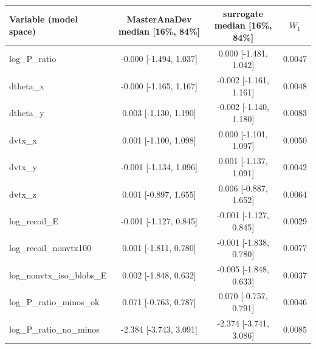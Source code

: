 \begin{tabular}{lccc}
\toprule
Variable (model space) & MasterAnaDev median [16\%, 84\%] & surrogate median [16\%, 84\%] & $W_1$ \\
\midrule
log\_P\_ratio & -0.000 [-1.494, 1.037] & 0.000 [-1.481, 1.042] & 0.0047 \\
dtheta\_x & -0.000 [-1.165, 1.167] & -0.002 [-1.161, 1.161] & 0.0048 \\
dtheta\_y & 0.003 [-1.130, 1.190] & -0.002 [-1.140, 1.180] & 0.0083 \\
dvtx\_x & 0.001 [-1.100, 1.098] & 0.000 [-1.101, 1.097] & 0.0050 \\
dvtx\_y & -0.001 [-1.134, 1.096] & 0.001 [-1.137, 1.091] & 0.0042 \\
dvtx\_z & 0.001 [-0.897, 1.655] & 0.006 [-0.887, 1.652] & 0.0064 \\
log\_recoil\_E & -0.001 [-1.127, 0.845] & -0.001 [-1.127, 0.845] & 0.0029 \\
log\_recoil\_nonvtx100 & 0.001 [-1.811, 0.780] & -0.001 [-1.838, 0.780] & 0.0077 \\
log\_nonvtx\_iso\_blobs\_E & 0.002 [-1.848, 0.632] & -0.005 [-1.848, 0.633] & 0.0037 \\
log\_P\_ratio\_minos\_ok & 0.071 [-0.763, 0.787] & 0.070 [-0.757, 0.791] & 0.0046 \\
log\_P\_ratio\_no\_minos & -2.384 [-3.743, 3.091] & -2.374 [-3.741, 3.086] & 0.0085 \\
\bottomrule
\end{tabular}

